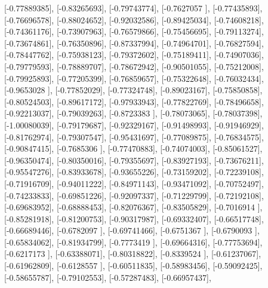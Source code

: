 \documentclass{article}
\begin{document}
       [-0.77889385],
       [-0.83265693],
       [-0.79743774],
       [-0.7627057 ],
       [-0.77435893],
       [-0.76696578],
       [-0.88024652],
       [-0.92032586],
       [-0.89425034],
       [-0.74608218],
       [-0.74361176],
       [-0.73907963],
       [-0.76579866],
       [-0.75456695],
       [-0.79113274],
       [-0.73674861],
       [-0.76350896],
       [-0.87337994],
       [-0.74964701],
       [-0.76827594],
       [-0.78447762],
       [-0.75938123],
       [-0.79372602],
       [-0.75189411],
       [-0.74907036],
       [-0.79779593],
       [-0.78889707],
       [-0.78672942],
       [-0.90501055],
       [-0.75212008],
       [-0.79925893],
       [-0.77205399],
       [-0.76859657],
       [-0.75322648],
       [-0.76032434],
       [-0.9653028 ],
       [-0.77852029],
       [-0.77324748],
       [-0.89023167],
       [-0.75850858],
       [-0.80524503],
       [-0.89617172],
       [-0.97933943],
       [-0.77822769],
       [-0.78496658],
       [-0.92213037],
       [-0.79039263],
       [-0.8723383 ],
       [-0.78073065],
       [-0.78037398],
       [-1.00080039],
       [-0.79179687],
       [-0.92329167],
       [-0.91498993],
       [-0.91946929],
       [-0.81762974],
       [-0.79307547],
       [-0.95431697],
       [-0.77089875],
       [-0.76834575],
       [-0.90847415],
       [-0.7685306 ],
       [-0.77470883],
       [-0.74074003],
       [-0.85061527],
       [-0.96350474],
       [-0.80350016],
       [-0.79355697],
       [-0.83927193],
       [-0.73676211],
       [-0.95547276],
       [-0.83933678],
       [-0.93655226],
       [-0.73159202],
       [-0.72239108],
       [-0.71916709],
       [-0.94011222],
       [-0.84971143],
       [-0.93471092],
       [-0.70752497],
       [-0.74233833],
       [-0.69851226],
       [-0.92097337],
       [-0.71229799],
       [-0.72192108],
       [-0.69683952],
       [-0.68888453],
       [-0.82076367],
       [-0.83505829],
       [-0.7016914 ],
       [-0.85281918],
       [-0.81200753],
       [-0.90317987],
       [-0.69332407],
       [-0.66517748],
       [-0.66689446],
       [-0.6782097 ],
       [-0.69741466],
       [-0.6751367 ],
       [-0.6790093 ],
       [-0.65834062],
       [-0.81934799],
       [-0.7773419 ],
       [-0.69664316],
       [-0.77753694],
       [-0.6217173 ],
       [-0.63388071],
       [-0.80318822],
       [-0.8339524 ],
       [-0.61237067],
       [-0.61962809],
       [-0.6128557 ],
       [-0.60511835],
       [-0.58983456],
       [-0.59092425],
       [-0.58655787],
       [-0.79102553],
       [-0.57287483],
       [-0.66957437],
\end{document}
